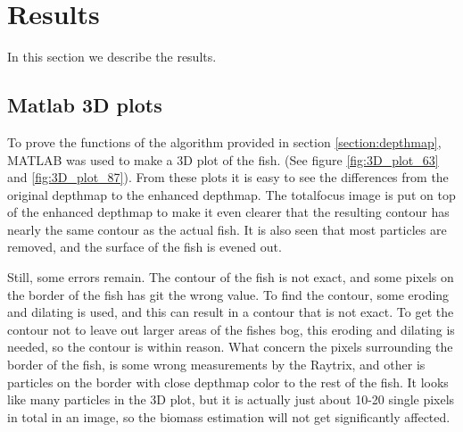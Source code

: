 \section{Results}\label{results}
In this section we describe the results.


\subsection{Matlab 3D plots}
To prove the functions of the algorithm provided in section \ref{section:depthmap}, MATLAB was used to make a 3D plot of the fish. (See figure \ref{fig:3D_plot_63} and \ref{fig:3D_plot_87}). From these plots it is easy to see the differences from the original depthmap to the enhanced depthmap. The totalfocus image is put on top of the enhanced depthmap to make it even clearer that the resulting contour has nearly the same contour as the actual fish. It is also seen that most particles are removed, and the surface of the fish is evened out.

Still, some errors remain. The contour of the fish is not exact, and some pixels on the border of the fish has git the wrong value. To find the contour, some eroding and dilating is used, and this can result in a contour that is not exact. To get the contour not to leave out larger areas of the fishes bog, this eroding and dilating is needed, so the contour is within reason. What concern the pixels surrounding the border of the fish, is some wrong measurements by the Raytrix, and other is particles on the border with close depthmap color to the rest of the fish. It looks like many particles in the 3D plot, but it is actually just about 10-20 single pixels in total in an image, so the biomass estimation will not get significantly affected.  


